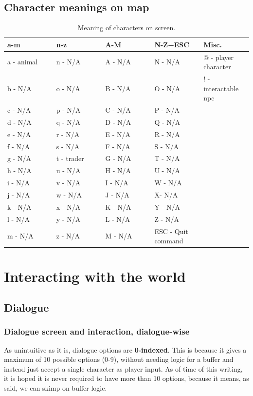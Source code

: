 \documentclass{report}
\begin{document}
\subsection*{Character meanings on map}
\begin{table}[h!]

\begin{tabular}{|p{0.2\linewidth}|p{0.2\linewidth}| p{0.2\linewidth}|p{0.2\linewidth}|p{0.2\linewidth}|} 
\hline
 a-m & n-z & A-M & N-Z+ESC & Misc. \\ [0.5ex] 
 \hline
 a - animal & n - N/A & A - N/A & N - N/A & @ - player character\\ 
 b - N/A & o - N/A & B - N/A & O - N/A  & ! - interactable npc \\ 
 c - N/A & p - N/A & C - N/A & P - N/A \\
 d - N/A & q - N/A & D - N/A & Q - N/A  \\
 e - N/A & r - N/A & E - N/A & R - N/A \\
 f - N/A & s - N/A & F - N/A & S - N/A \\
 g - N/A & t - trader & G - N/A & T - N/A \\
 h - N/A & u - N/A & H - N/A & U - N/A \\
 i - N/A & v - N/A & I - N/A & W - N/A \\
 j - N/A & w - N/A & J - N/A & X- N/A \\
 k - N/A & x - N/A & K - N/A & Y - N/A \\
 l - N/A & y - N/A & L - N/A & Z - N/A \\
 m - N/A & z - N/A & M - N/A & ESC - Quit command \\ [1ex] 
 \hline
\end{tabular}
\caption{Meaning of characters on screen.}
\label{table:1}
\end{table}
\section*{Interacting with the world}
\subsection*{Dialogue}
\subsubsection*{Dialogue screen and interaction, dialogue-wise}
As unintuitive as it is, dialogue options are \textbf{0-indexed}. This is because it gives a maximum of 10 possible options (0-9), without needing logic for a buffer and instead just accept a single character as player input. As of time of this writing, it is hoped it is never required to have more than 10 options, because it means, as said, we can skimp on buffer logic.
\end{document}
